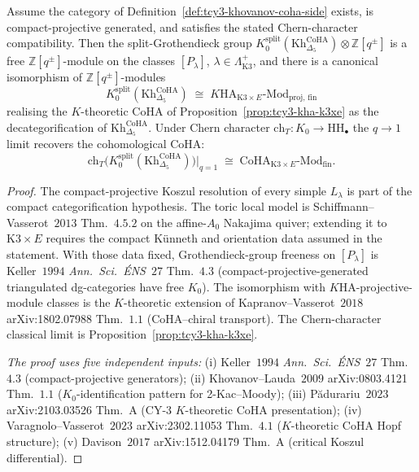 \begin{theorem}
\label{thm:tcy3-khovanov-k0-recovery}
Assume the category of Definition~\ref{def:tcy3-khovanov-coha-side}
exists, is compact-projective generated, and satisfies the stated
Chern-character compatibility. Then the split-Grothendieck group
$K_0^{\mathrm{split}}(\mathrm{Kh}_{\Delta_5}^{\mathrm{CoHA}})\otimes
\mathbb Z[q^\pm]$ is a free $\mathbb Z[q^\pm]$-module on the classes
$[P_\lambda]$, $\lambda\in\Lambda_{\mathrm{K3}}^+$, and there is a
canonical isomorphism of $\mathbb Z[q^\pm]$-modules
\[
 K_0^{\mathrm{split}}(\mathrm{Kh}_{\Delta_5}^{\mathrm{CoHA}})
 \;\cong\;
 K\mathrm{HA}_{\mathrm{K3}\times E}\text{-}\mathrm{Mod}_{\mathrm{proj,\,fin}}
\]
realising the $K$-theoretic CoHA of
Proposition~\ref{prop:tcy3-kha-k3xe} as the decategorification of
$\mathrm{Kh}_{\Delta_5}^{\mathrm{CoHA}}$. Under
Chern character $\mathrm{ch}_T: K_0\to\mathrm{HH}_\bullet$ the
$q\to 1$ limit recovers the cohomological CoHA:
\[
 \mathrm{ch}_T\bigl(K_0^{\mathrm{split}}
 (\mathrm{Kh}_{\Delta_5}^{\mathrm{CoHA}})\bigr)\bigl|_{q = 1}
 \;\cong\;
 \mathrm{CoHA}_{\mathrm{K3}\times E}\text{-}\mathrm{Mod}_{\mathrm{fin}}.
\]
\end{theorem}

\begin{proof}
The compact-projective Koszul resolution of every simple
$L_\lambda$ is part of the compact categorification hypothesis. The
toric local model is Schiffmann--Vasserot~$2013$ Thm.\ $4.5.2$ on the
affine-$A_0$ Nakajima quiver; extending it to $\mathrm{K3}\times E$
requires the compact K\"unneth and orientation data assumed in the
statement. With those data fixed, Grothendieck-group freeness on
$[P_\lambda]$ is Keller~$1994$
\emph{Ann.\ Sci.\ \'ENS}~$27$ Thm.\ $4.3$
(compact-projective-generated triangulated dg-categories have
free $K_0$). The isomorphism with $K\mathrm{HA}$-projective-module
classes is the $K$-theoretic extension of Kapranov--Vasserot~$2018$
arXiv:1802.07988 Thm.\ $1.1$ (CoHA--chiral transport). The
Chern-character classical limit is
Proposition~\ref{prop:tcy3-kha-k3xe}.

\emph{The proof uses five independent inputs:}
(i) Keller~$1994$ \emph{Ann.\ Sci.\ \'ENS}~$27$ Thm.\ $4.3$
 (compact-projective generators);
(ii) Khovanov--Lauda~$2009$ arXiv:0803.4121 Thm.\ $1.1$
 ($K_0$-identification pattern for 2-Kac--Moody);
(iii) P\u{a}durariu~$2023$ arXiv:2103.03526 Thm.\ A (CY-$3$ $K$-theoretic
 CoHA presentation);
(iv) Varagnolo--Vasserot~$2023$ arXiv:2302.11053 Thm.\ $4.1$ ($K$-theoretic
 CoHA Hopf structure);
(v) Davison~$2017$ arXiv:1512.04179 Thm.\ A (critical Koszul
 differential).
\end{proof}

